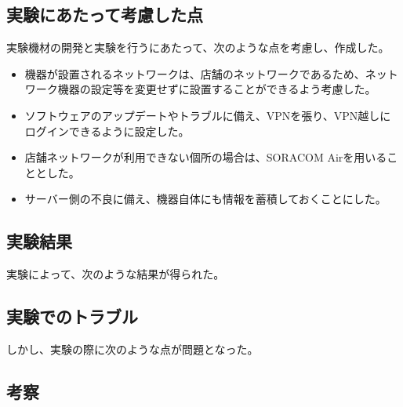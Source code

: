\subsection{実験にあたって考慮した点}
実験機材の開発と実験を行うにあたって、次のような点を考慮し、作成した。
\begin{itemize}
\item 機器が設置されるネットワークは、店舗のネットワークであるため、ネットワーク機器の設定等を変更せずに設置することができるよう考慮した。
\item ソフトウェアのアップデートやトラブルに備え、VPNを張り、VPN越しにログインできるように設定した。
\item 店舗ネットワークが利用できない個所の場合は、SORACOM Airを用いることとした。
\item サーバー側の不良に備え、機器自体にも情報を蓄積しておくことにした。
\end{itemize}

\subsection{実験結果}
実験によって、次のような結果が得られた。


\subsection{実験でのトラブル}
しかし、実験の際に次のような点が問題となった。


\subsection{考察}













